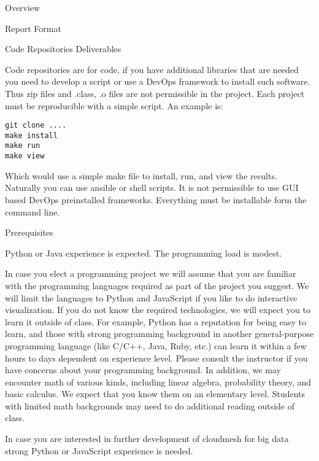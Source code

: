 \begin{edXchapter}{Overview}
\begin{edXsection}{Report Format}
\end{edXsection}
\begin{edXsection}{Code Repositories
Deliverables}\label{code-repositories-deliverables}

Code repositories are for code, if you have additional libraries that
are needed you need to develop a script or use a DevOps framework to
install such software. Thus zip files and .class, .o files are not
permissible in the project. Each project must be reproducible with a
simple script. An example is:

\begin{verbatim}
git clone ....
make install
make run
make view
\end{verbatim}

Which would use a simple make file to install, run, and view the
results. Naturally you can use ansible or shell scripts. It is not
permissible to use GUI based DevOps preinstalled frameworks. Everything
must be installable form the command line.

\end{edXsection}
\begin{edXsection}{Prerequisites}\label{prerequisites}

Python or Java experience is expected. The programming load is modest.

In case you elect a programming project we will assume that you are
familiar with the programming languages required as part of the project
you suggest. We will limit the languages to Python and JavaScript if you
like to do interactive visualization. If you do not know the required
technologies, we will expect you to learn it outside of class. For
example, Python has a reputation for being easy to learn, and those with
strong programming background in another general-purpose programming
language (like C/C++, Java, Ruby, etc.) can learn it within a few hours
to days dependent on experience level. Please consult the instructor if
you have concerns about your programming background. In addition, we may
encounter math of various kinds, including linear algebra, probability
theory, and basic calculus. We expect that you know them on an
elementary level. Students with limited math backgrounds may need to do
additional reading outside of class.

In case you are interested in further development of cloudmesh for big
data strong Python or JavaScript experience is needed.


\end{edXsection}
\end{edXchapter}
